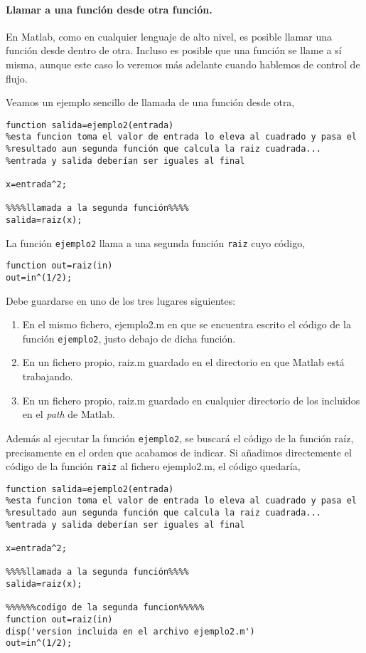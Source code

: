 \paragraph{Llamar a una función desde otra función.}
En Matlab, como en cualquier lenguaje de alto nivel, es posible llamar una función desde dentro de otra. Incluso es posible que una función se llame a sí misma, aunque este caso lo veremos más adelante cuando hablemos de control de flujo. 

Veamos un ejemplo sencillo de llamada de una función desde otra,

\begin{verbatim}
function salida=ejemplo2(entrada)
%esta funcion toma el valor de entrada lo eleva al cuadrado y pasa el
%resultado aun segunda función que calcula la raiz cuadrada...
%entrada y salida deberían ser iguales al final

x=entrada^2;

%%%%llamada a la segunda función%%%%
salida=raiz(x);
\end{verbatim}

La función \texttt{ejemplo2} llama a una segunda función \texttt{raiz} cuyo código,

\begin{verbatim}
function out=raiz(in)
out=in^(1/2);
\end{verbatim}

Debe guardarse en uno de los tres lugares siguientes:
\begin{enumerate}
\item En el mismo fichero, ejemplo2.m en que se encuentra escrito el código de la función \texttt{ejemplo2}, justo debajo de dicha función.
\item En un fichero propio, raiz.m guardado en el directorio en que Matlab está trabajando.
\item En un fichero propio, raiz.m guardado en cualquier directorio de los incluidos en el \emph{path} de Matlab.
\end{enumerate}

Además al ejecutar la función \texttt{ejemplo2}, se buscará el código de la función raíz, precisamente en el orden que acabamos de indicar. Si añadimos directemente el código de la función \texttt{raiz} al fichero ejemplo2.m, el código quedaría,

\begin{verbatim}
function salida=ejemplo2(entrada)
%esta funcion toma el valor de entrada lo eleva al cuadrado y pasa el
%resultado aun segunda función que calcula la raiz cuadrada...
%entrada y salida deberían ser iguales al final

x=entrada^2;

%%%%llamada a la segunda función%%%%
salida=raiz(x);

%%%%%%codigo de la segunda funcion%%%%%
function out=raiz(in)
disp('version incluida en el archivo ejemplo2.m')
out=in^(1/2);
\end{verbatim}

